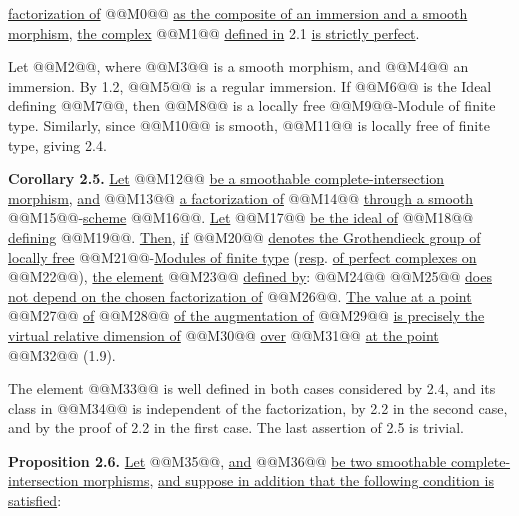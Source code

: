 \uline{factorization of} @@M0@@ \uline{as the composite of an immersion and a smooth morphism}, \uline{the complex} @@M1@@ \uline{defined in} 2.1 \uline{is strictly perfect}.

Let @@M2@@, where @@M3@@ is a smooth morphism, and @@M4@@ an immersion. By 1.2, @@M5@@ is a regular immersion. If @@M6@@ is the Ideal defining @@M7@@, then @@M8@@ is a locally free @@M9@@-Module of finite type. Similarly, since @@M10@@ is smooth, @@M11@@ is locally free of finite type, giving 2.4.

\textbf{Corollary 2.5.} \uline{Let} @@M12@@ \uline{be a smoothable complete-intersection morphism}, \uline{and} @@M13@@ \uline{a factorization of} @@M14@@ \uline{through a smooth} @@M15@@-\uline{scheme} @@M16@@. \uline{Let} @@M17@@ \uline{be the ideal of} @@M18@@ \uline{defining} @@M19@@. \uline{Then}, \uline{if} @@M20@@ \uline{denotes the Grothendieck group of locally free} @@M21@@-\uline{Modules of finite type} (\uline{resp}. \uline{of perfect complexes on} @@M22@@), \uline{the element} @@M23@@ \uline{defined by}:
@@M24@@
@@M25@@
\uline{does not depend on the chosen factorization of} @@M26@@. \uline{The value at a point} @@M27@@ \uline{of} @@M28@@ \uline{of the augmentation of} @@M29@@ \uline{is precisely the virtual relative dimension of} @@M30@@ \uline{over} @@M31@@ \uline{at the point} @@M32@@ (1.9).

The element @@M33@@ is well defined in both cases considered by 2.4, and its class in @@M34@@ is independent of the factorization, by 2.2 in the second case, and by the proof of 2.2 in the first case. The last assertion of 2.5 is trivial.

\textbf{Proposition 2.6.} \uline{Let} @@M35@@, \uline{and} @@M36@@ \uline{be two smoothable complete-intersection morphisms}, \uline{and suppose in addition that the following condition is satisfied}:
